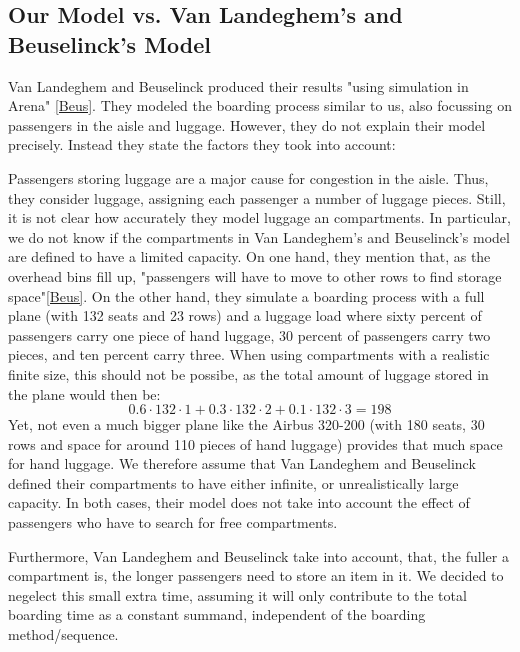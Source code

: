 \documentclass[11pt]{article}
\begin{document}
\subsection{Our Model vs. Van Landeghem's and Beuselinck's Model} 

Van Landeghem and Beuselinck produced their results "using simulation in Arena" \ref{Beus}. They modeled the boarding process similar to us, also focussing on passengers in the aisle and luggage. However, they do not explain their model precisely. Instead they state the factors they took into account:


Passengers storing luggage are a major cause for congestion in the aisle. Thus, they consider luggage, assigning each passenger a number of luggage pieces. Still, it is not clear how accurately they model luggage an compartments. In particular, we do not know if the compartments in Van Landeghem's and Beuselinck's model are defined to have a limited capacity. On one hand, they mention that, as the overhead bins fill up, "passengers will have to move to other rows to find storage space"\ref{Beus}. On the other hand, they simulate a boarding process with a full plane (with 132 seats and 23 rows) and a luggage load where sixty percent of passengers carry one piece of hand luggage, 30 percent of passengers carry two pieces, and ten percent carry three. When using compartments with a realistic finite size, this should not be possibe, as the total amount of luggage stored in the plane would then be:
$$ 0.6 \cdot 132 \cdot 1+ 0.3 \cdot 132 \cdot 2 + 0.1 \cdot 132 \cdot 3 = 198$$
Yet, not even a much bigger plane like the Airbus 320-200 (with 180 seats, 30 rows and space for around 110 pieces of hand luggage) provides that much space for hand luggage. We therefore assume that Van Landeghem and Beuselinck defined their compartments to have either infinite, or unrealistically large capacity. In both cases, their model does not take into account the effect of passengers who have to search for free compartments.


Furthermore, Van Landeghem and Beuselinck take into account, that, the fuller a compartment is, the longer passengers need to store an item in it. We decided to negelect this small extra time, assuming it will only contribute to the total boarding time as a constant summand, independent of the boarding method/sequence.
\end{document}
